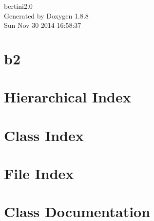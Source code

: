 \documentclass[twoside]{book}
\newcommand{\+}{\discretionary{\mbox{\scriptsize$\hookleftarrow$}}{}{}}
\newcommand{\clearemptydoublepage}{%
  \newpage{\pagestyle{empty}\cleardoublepage}%
}
\begin{document}
\hypersetup{pageanchor=false,
             bookmarks=true,
             bookmarksnumbered=true,
             pdfencoding=unicode
            }
\begin{titlepage}
\vspace*{7cm}
\begin{center}%
{\Large bertini2.0 }\\
\vspace*{1cm}
{\large Generated by Doxygen 1.8.8}\\
\vspace*{0.5cm}
{\small Sun Nov 30 2014 16:58:37}\\
\end{center}
\end{titlepage}
\clearemptydoublepage
\tableofcontents
\clearemptydoublepage
{}
\hypersetup{pageanchor=true}

\chapter{b2}
\label{md__r_e_a_d_m_e}
\hypertarget{md__r_e_a_d_m_e}{}

\chapter{Hierarchical Index}

\chapter{Class Index}

\chapter{File Index}

\chapter{Class Documentation}


























\end{document}
